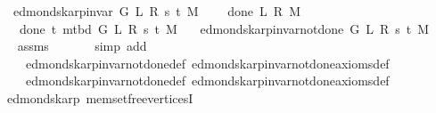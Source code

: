 \begin{isabellebody}
\ \ \ {\isachardoublequoteopen}edmonds{\isacharunderscore}{\kern0pt}karp{\isacharunderscore}{\kern0pt}invar{\isacharprime}{\kern0pt}\ G\ L\ R\ s\ t\ M{\isachardoublequoteclose}\isanewline
\ \ \ {\isachardoublequoteopen}{\isasymnot}\ done{\isacharunderscore}{\kern0pt}{}\ L\ R\ M{\isachardoublequoteclose}\isanewline
\ \ \ {\isachardoublequoteopen}{\isasymnot}\ done{\isacharunderscore}{\kern0pt}{}\ t\ {\isacharparenleft}{\kern0pt}m{\isacharunderscore}{\kern0pt}tbd\ G\ L\ R\ s\ t\ M{\isacharparenright}{\kern0pt}{\isachardoublequoteclose}\isanewline
\ \ \ {\isachardoublequoteopen}edmonds{\isacharunderscore}{\kern0pt}karp{\isacharunderscore}{\kern0pt}invar{\isacharunderscore}{\kern0pt}not{\isacharunderscore}{\kern0pt}done{\isacharunderscore}{\kern0pt}{}{\isacharprime}{\kern0pt}\ G\ L\ R\ s\ t\ M{\isachardoublequoteclose}%
\endisataginvisible
{\isafoldinvisible}%
%
\isadeliminvisible
\isanewline
%
\endisadeliminvisible
%
\isadelimproof
\ \ %
\endisadelimproof
%
\isatagproof
{}\isamarkupfalse%
\ assms\isanewline
\ \ \isamarkupfalse%
\isanewline
\ \ \ \ {\isacharparenleft}{\kern0pt}simp\ add{\isacharcolon}{\kern0pt}\isanewline
\ \ \ \ \ edmonds{\isacharunderscore}{\kern0pt}karp{\isacharunderscore}{\kern0pt}invar{\isacharunderscore}{\kern0pt}not{\isacharunderscore}{\kern0pt}done{\isacharunderscore}{\kern0pt}{}{\isacharunderscore}{\kern0pt}def\ edmonds{\isacharunderscore}{\kern0pt}karp{\isacharunderscore}{\kern0pt}invar{\isacharunderscore}{\kern0pt}not{\isacharunderscore}{\kern0pt}done{\isacharunderscore}{\kern0pt}{}{\isacharunderscore}{\kern0pt}axioms{\isacharunderscore}{\kern0pt}def\isanewline
\ \ \ \ \ edmonds{\isacharunderscore}{\kern0pt}karp{\isacharunderscore}{\kern0pt}invar{\isacharunderscore}{\kern0pt}not{\isacharunderscore}{\kern0pt}done{\isacharunderscore}{\kern0pt}{}{\isacharunderscore}{\kern0pt}def\ edmonds{\isacharunderscore}{\kern0pt}karp{\isacharunderscore}{\kern0pt}invar{\isacharunderscore}{\kern0pt}not{\isacharunderscore}{\kern0pt}done{\isacharunderscore}{\kern0pt}{}{\isacharunderscore}{\kern0pt}axioms{\isacharunderscore}{\kern0pt}def{\isacharparenright}{\kern0pt}%
\endisatagproof
{\isafoldproof}%
%
\isadelimproof
\isanewline
%
\endisadelimproof
%
\isadeliminvisible
\isanewline
%
\endisadeliminvisible
%
\isataginvisible
{}\isamarkupfalse%
\ {\isacharparenleft}{\kern0pt}\ edmonds{\isacharunderscore}{\kern0pt}karp{\isacharparenright}{\kern0pt}\ mem{\isacharunderscore}{\kern0pt}set{\isacharunderscore}{\kern0pt}free{\isacharunderscore}{\kern0pt}verticesI{\isacharcolon}{\kern0pt}\isanewline

\end{isabellebody}
